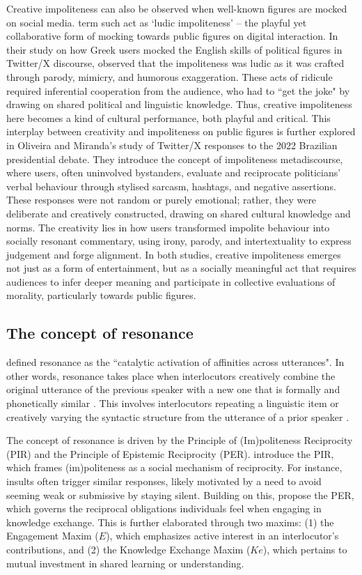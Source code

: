 \documentclass[english]{textolivre}
\begin{document}
Creative impoliteness can also be observed when well-known figures are mocked on social media. \textcite{vladimirou2018} term such act as ‘ludic impoliteness’ -- the playful yet collaborative form of mocking towards public figures on digital interaction. In their study on how Greek users mocked the English skills of political figures in Twitter/X discourse, \textcite{vladimirou2018} observed that the impoliteness was ludic as it was crafted through parody, mimicry, and humorous exaggeration. These acts of ridicule required inferential cooperation from the audience, who had to ``get the joke" by drawing on shared political and linguistic knowledge. Thus, creative impoliteness here becomes a kind of cultural performance, both playful and critical. This interplay between creativity and impoliteness on public figures is further explored in Oliveira and Miranda’s \citeyear{oliveira2024} study of Twitter/X responses to the 2022 Brazilian presidential debate. They introduce the concept of impoliteness metadiscourse, where users, often uninvolved bystanders, evaluate and reciprocate politicians’ verbal behaviour through stylised sarcasm, hashtags, and negative assertions. These responses were not random or purely emotional; rather, they were deliberate and creatively constructed, drawing on shared cultural knowledge and norms. The creativity lies in how users transformed impolite behaviour into socially resonant commentary, using irony, parody, and intertextuality to express judgement and forge alignment. In both studies, creative impoliteness emerges not just as a form of entertainment, but as a socially meaningful act that requires audiences to infer deeper meaning and participate in collective evaluations of morality, particularly towards public figures.

\subsection{The concept of resonance}
\textcite[p. 372]{dubois2014} defined resonance as the ``catalytic activation of affinities across utterances". In other words, resonance takes place when interlocutors creatively combine the original utterance of the previous speaker with a new one that is formally and phonetically similar \cite{tantucci2021}. This involves interlocutors repeating a linguistic item or creatively varying the syntactic structure from the utterance of a prior speaker \cite{tantucci2022b}.

The concept of resonance is driven by the Principle of (Im)politeness Reciprocity (PIR) and the Principle of Epistemic Reciprocity (PER). \textcite{culpeper2021} introduce the PIR, which frames (im)politeness as a social mechanism of reciprocity. For instance, insults often trigger similar responses, likely motivated by a need to avoid seeming weak or submissive by staying silent. Building on this, \textcite{tantucci2022} propose the PER, which governs the reciprocal obligations individuals feel when engaging in knowledge exchange. This is further elaborated through two maxims: (1) the Engagement Maxim ($E$), which emphasizes active interest in an interlocutor’s contributions, and (2) the Knowledge Exchange Maxim ($Ke$), which pertains to mutual investment in shared learning or understanding.
\end{document}
